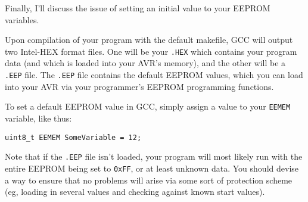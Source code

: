 \documentclass[a4paper,oneside,notitlepage]{book}
\begin{document}
Finally, I'll discuss the issue of setting an initial value to your EEPROM variables.

Upon compilation of your program with the default makefile, GCC will output two Intel-HEX format files. One will be your \texttt{.HEX} which contains your program data (and which is loaded into your AVR's memory), and the other will be a \texttt{.EEP} file. The \texttt{.EEP} file contains the default EEPROM values, which you can load into your AVR via your programmer's EEPROM programming functions.

To set a default EEPROM value in GCC, simply assign a value to your \lstinline{EEMEM} variable, like thus:

\begin{center}
\begin{lstlisting}
uint8_t EEMEM SomeVariable = 12;
\end{lstlisting}
\end{center}

Note that if the \texttt{.EEP} file isn't loaded, your program will most likely run with the entire EEPROM being set to \lstinline{0xFF}, or at least unknown data. You should devise a way to ensure that no problems will arise via some sort of protection scheme (eg, loading in several values and checking against known start values).
\end{document}
